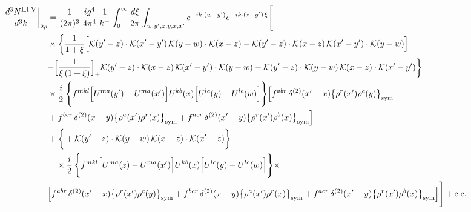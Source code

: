 \documentclass[9pt]{article}
\numberwithin{equation}{section}
\begin{document}
\begin{align}
\frac{d^{3}N^{\rm III.V}}{d^{3}k}\bigg|_{2\rho}&=\frac{1}{(2\pi)^{3}}\,\frac{ig^{4}}{4\pi^{4}}\,\frac{1}{k^{+}}\int_{0}^{\infty}\frac{d\xi}{2\pi}\int_{w,y',z,y,x,x'}e^{-ik\cdot(w-y')}e^{-ik\cdot(z-y')\,\xi}\Bigg[\notag\\
&\times\bigg\{\frac{1}{1+\xi}\Big[\mathcal{K}(y'-z)\cdot\mathcal{K}(x'-y')\,\mathcal{K}(y-w)\cdot\mathcal{K}(x-z)-\mathcal{K}(y'-z)\cdot\mathcal{K}(x-z)\,\mathcal{K}(x'-y')\cdot\mathcal{K}(y-w)\Big]\notag\\
&{-\Big[\frac{1}{\xi\,(1+\xi)}\Big]_{+}\mathcal{K}(y'-z)\cdot\mathcal{K}(x-z)\,\mathcal{K}(x'-y')\cdot\mathcal{K}(y-w)}-\mathcal{K}(y'-z)\cdot\mathcal{K}(y-w)\,\mathcal{K}(x-z)\cdot\mathcal{K}(x'-y')\bigg\}\notag\\
&\times \frac{i}{2}\,\Bigg\{f^{mkl}\Big[U^{ma}(y')-U^{ma}(x')\Big]U^{kb}(x)\Big[U^{lc}(y)-U^{lc}(w)\Big]\Bigg\}\Big[f^{abr}\,\delta^{(2)}(x'-x)\big\{\rho^{r}(x')\rho^{c}(y)\big\}_{\rm sym}\notag\\
& +f^{bcr}\,\delta^{(2)}(x-y)\big\{\rho^{a}(x')\rho^{r}(x)\big\}_{\rm sym}+f^{acr}\,\delta^{(2)}(x'-y)\big\{\rho^{r}(x')\rho^{b}(x)\big\}_{\rm sym}\Big]\notag\\
&+\bigg\{+\mathcal{K}(y'-z)\cdot\mathcal{K}(y-w)\,\mathcal{K}(x-z)\cdot\mathcal{K}(x'-z)\bigg\}\notag\\&\quad\times \frac{i}{2}\,\Bigg\{f^{mkl}\Big[U^{ma}(z)-U^{ma}(x')\Big]U^{kb}(x)\Big[U^{lc}(y)-U^{lc}(w)\Big]\Bigg\}\times\,\notag \\ & \Big[f^{abr}\,\delta^{(2)}(x'-x)\big\{\rho^{r}(x')\rho^{c}(y)\big\}_{\rm sym} +f^{bcr}\,\delta^{(2)}(x-y)\big\{\rho^{a}(x')\rho^{r}(x)\big\}_{\rm sym}+f^{acr}\,\delta^{(2)}(x'-y)\big\{\rho^{r}(x')\rho^{b}(x)\big\}_{\rm sym}\Big]\Bigg]+{\rm c.c.}\label{eq:H-III.V-2}
\end{align}
\end{document}
